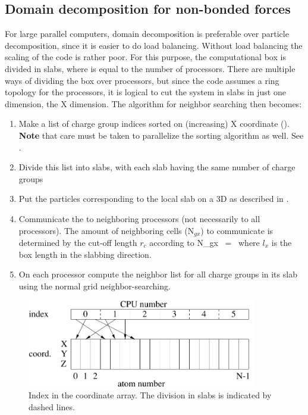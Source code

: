 \subsection{Domain decomposition for non-bonded forces}
For large parallel computers, domain decomposition is preferable over
particle decomposition, since it is easier to do load
balancing. Without load balancing the scaling of the code is rather
poor. For this purpose, the computational box is divided in {\nproc}
slabs, where {\nproc} is equal to the number of processors. There are
multiple ways of dividing the box over processors, but since the
{\gromacs} code assumes a ring topology for the processors, it is
logical to cut the system in slabs in just one dimension, the X
dimension.  The algorithm for neighbor searching then becomes:
\begin{enumerate}
\item   Make a list of charge group indices sorted on (increasing) X coordinate
        ().
        {\bf Note} that care must be taken to parallelize the sorting algorithm
        as well. See .
\item   Divide this list into slabs, with each slab having the same number of
        charge groups
\item   Put the particles corresponding to the local slab on a 3D {\nsgrid} as 
        described in .
\item   Communicate the {\nsgrid} to neighboring processors (not necessarily to all
        processors). The amount of neighboring {\nsgrid} cells (N$_{gx}$) to 
        communicate is determined by the cut-off length $r_c$ according to
        \beq
        N_{gx}  ~=~        
        \eeq
        where $l_x$ is the box length in the slabbing direction. 
\item   On each processor compute the neighbor list for all charge groups in
        its slab using the normal grid neighbor-searching.
\end{enumerate}

\begin{figure}
\centerline{\includegraphics[width=10cm]{plots/parsort}}
\caption[Index in the coordinate array.]{Index in the coordinate
array. The division in slabs is indicated by dashed lines.}
\label{fig:parsort}
\end{figure}


